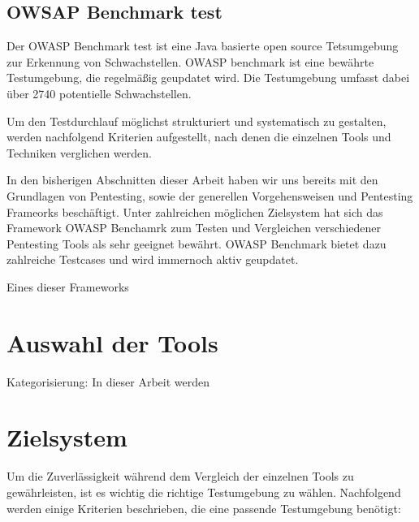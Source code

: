 \subsection{OWSAP Benchmark test}
Der OWASP Benchmark test ist eine Java basierte open source Tetsumgebung zur Erkennung von Schwachstellen.
OWASP benchmark ist eine bewährte Testumgebung, die regelmäßig geupdatet wird. Die Testumgebung umfasst dabei über 2740 potentielle Schwachstellen.

Um den Testdurchlauf möglichst strukturiert und systematisch zu gestalten, werden nachfolgend Kriterien aufgestellt, nach denen die einzelnen Tools und Techniken verglichen werden. 

In den bisherigen Abschnitten dieser Arbeit haben wir uns bereits mit den Grundlagen von Pentesting, sowie der generellen Vorgehensweisen und Pentesting Frameorks beschäftigt. 
Unter zahlreichen möglichen Zielsystem hat sich das Framework OWASP Benchamrk zum Testen und Vergleichen verschiedener Pentesting Tools als sehr geeignet bewährt.
OWASP Benchmark bietet dazu zahlreiche Testcases und wird immernoch aktiv geupdatet. 

Eines dieser Frameworks

\section{Auswahl der Tools}

Kategorisierung: In dieser Arbeit werden 


\section{Zielsystem}

Um die Zuverlässigkeit während dem Vergleich der einzelnen Tools zu gewährleisten, ist es wichtig die richtige Testumgebung zu wählen. 
Nachfolgend werden einige Kriterien beschrieben, die eine passende Testumgebung benötigt:

